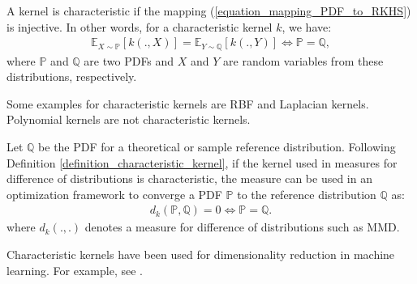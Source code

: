 \documentclass[lang=cn,10pt]{gorgeousnbook}
\numberwithin{equation}{section}%
\numberwithin{figure}{section}%
\begin{document}
\begin{definition}\label{definition_characteristic_kernel}
A kernel is characteristic if the mapping (\ref{equation_mapping_PDF_to_RKHS}) is injective. In other words, for a characteristic kernel $k$, we have:
\begin{align}
\mathbb{E}_{X \sim \mathbb{P}}[k(., X)] = \mathbb{E}_{Y \sim \mathbb{Q}}[k(., Y)] \iff \mathbb{P} = \mathbb{Q},
\end{align}
where $\mathbb{P}$ and $\mathbb{Q}$ are two PDFs and $X$ and $Y$ are random variables from these distributions, respectively. 
\end{definition}
Some examples for characteristic kernels are RBF and Laplacian kernels. Polynomial kernels are not characteristic kernels. %

\begin{corollary}\label{corollary_characteristic_kernel_convergence_of_distributions}
Let $\mathbb{Q}$ be the PDF for a theoretical or sample reference distribution. Following Definition \ref{definition_characteristic_kernel}, if the kernel used in measures for difference of distributions is characteristic, the measure can be used in an optimization framework to converge a PDF $\mathbb{P}$ to the reference distribution $\mathbb{Q}$ as:
\begin{align}
d_k(\mathbb{P}, \mathbb{Q}) = 0 \iff \mathbb{P} = \mathbb{Q}.
\end{align}
where $d_k(.,.)$ denotes a measure for difference of distributions such as MMD. 
\end{corollary}

Characteristic kernels have been used for dimensionality reduction in machine learning. For example, see \cite{fukumizu2004dimensionality,fukumizu2009kernel}.
\end{document}
